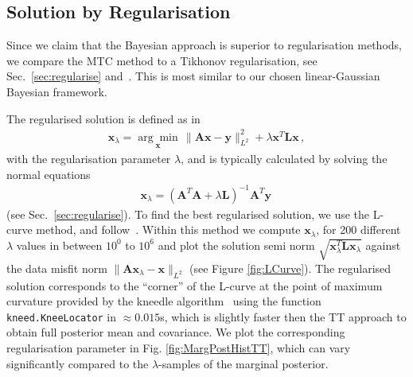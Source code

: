 \subsection{Solution by Regularisation}
\label{sec:reg}
Since we claim that the Bayesian approach is superior to regularisation methods, we compare the MTC method to a Tikhonov regularisation, see Sec.~\ref{sec:regularise} and~\cite{fox2016fast}.
This is most similar to our chosen linear-Gaussian Bayesian framework.

The regularised solution is defined as in~\cite{hansen2010discrete, fox2016fast} 
\begin{align}
	\bm{x}_{\lambda} =\underset{ \bm{x}}{\arg \min}\,  \lVert \bm{A}\bm{x} - \bm{y} \rVert_{L^2}^2 + \lambda \bm{x}^T \bm{L} \bm{x} \, ,
	\label{eq:XLam}
\end{align}
with the regularisation parameter $\lambda$,
and is typically calculated by solving the normal equations
\begin{align}
	\bm{x}_{\lambda} = (\bm{A}^T\bm{A} + \lambda \bm{L} )^{-1} \bm{A}^T \bm{y} \label{eq:xLam} \, 
\end{align}
(see Sec.~\ref{sec:regularise}).
To find the best regularised solution, we use the L-curve method, and follow~\cite{hansen1993use}.
Within this method we compute $\bm{x}_\lambda$, for 200 different $\lambda$ values in between $10^{0}$ to $10^{6}$ and plot the solution semi norm $\sqrt{\bm{x}_\lambda^T\mathbf{L} \bm{x}_\lambda}$ against the data misfit norm $\lVert \bm{A}\bm{x}_\lambda - \bm{x} \rVert_{L^2}$ (see Figure \ref{fig:LCurve}). 
The regularised solution corresponds to the ``corner'' of the L-curve at the point of maximum curvature provided by the kneedle algorithm~\cite{satopaa2011kneedle} using the function \texttt{kneed.KneeLocator} in $\approx 0.015$s, which is slightly faster then the TT approach to obtain full posterior mean and covariance.
We plot the corresponding regularisation parameter in Fig. \ref{fig:MargPostHistTT}, which can vary significantly compared to the $\lambda$-samples of the marginal posterior.
